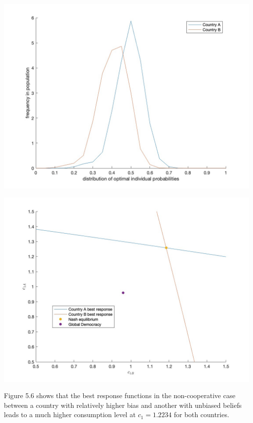 \documentclass[11pt,preprint, authoryear]{elsarticle}
\let\origfigure\figure
\let\endorigfigure\endfigure
\renewenvironment{figure}[1][2] {
    \expandafter\origfigure\expandafter[H]
} {
    \endorigfigure
}
\numberwithin{equation}{section}
\numberwithin{figure}{section}
\numberwithin{table}{section}
\begin{document}
\begin{figure}[H]

{\centering \includegraphics[width=0.75\linewidth]{images/Fig4_0.5Size0.9Bias} 

}

\caption{Asymmetric country bias model: Kernel density function of the distribution of the optimal probabilty of crisis and frequency thereof across individuals in country A and country B}\label{fig:Fig 5.5}
\end{figure}
\begin{figure}[H]

{\centering \includegraphics[width=0.75\linewidth]{images/Fig2_0.5Size0.9Bias} 

}

\caption{Best response functions for assymetric bias model}\label{fig:Fig 5.6}
\end{figure}

Figure 5.6 shows that the best response functions in the non-cooperative
case between a country with relatively higher bias and another with
unbiased beliefs leads to a much higher consumption level at
\(c_1=1.2234\) for both countries.
\end{document}
